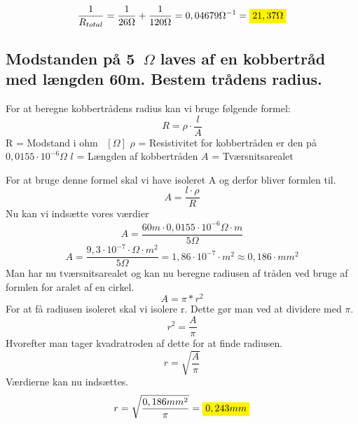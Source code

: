 \begin{equation*}
    \frac{1}{R_{total}}=\frac{1}{26\Omega}+\frac{1}{120\Omega}=0,04679\Omega^{-1}=\mathcolorbox{yellow}{21,37\Omega}
\end{equation*}

\subsection{Modstanden på 5~$\Omega$ laves af en kobbertråd med længden 60m. Bestem trådens radius.}
For at beregne kobbertrådens radius kan vi bruge følgende formel:
\begin{equation*}
    R=\rho\cdot\frac{l}{A}
\end{equation*}
R = Modstand i ohm ~$\left[ \Omega \right]$\newline
    $\rho$ = Resistivitet for kobbertråden er den på $0,0155 \cdot 10^{-6} \Omega$ \newline
    $l$ = Længden af kobbertråden\newline
    $A$ = Tværsnitsarealet\newline

For at bruge denne formel skal vi have isoleret A og derfor bliver formlen til.
\begin{equation*}
    A=\frac{l\cdot\rho}{R}
\end{equation*}
Nu kan vi indsætte vores værdier
\begin{equation*}
    A=\frac{60m\cdot0,0155 \cdot 10^{-6} \Omega \cdot m}{5\Omega}
\end{equation*}
\begin{equation*}
    A = \frac{9,3 \cdot 10^{-7} \cdot \Omega \cdot m^{2}}{5 \Omega} = 1,86 \cdot 10^{-7} \cdot m^{2} \approx 0,186 \cdot mm^{2}
\end{equation*}
Man har nu tværsnitsarealet og kan nu beregne radiusen af tråden ved bruge af formlen for aralet af en cirkel.
\begin{equation*}
    A=\pi*r^{2}
\end{equation*}
For at få radiusen isoleret skal vi isolere r. Dette gør man ved at dividere med $\pi$.
\begin{equation*}
    r^{2}=\frac{A}{\pi}
\end{equation*}
Hvorefter man tager kvadratroden af dette for at finde radiusen.
\begin{equation*}
    r=\sqrt{\frac{A}{\pi}}
\end{equation*}
Værdierne kan nu indsættes.
\begin{equation*}
    r=\sqrt{\frac{0,186mm^{2}}{\pi}} = \mathcolorbox{yellow}{0,243 mm}
\end{equation*}

